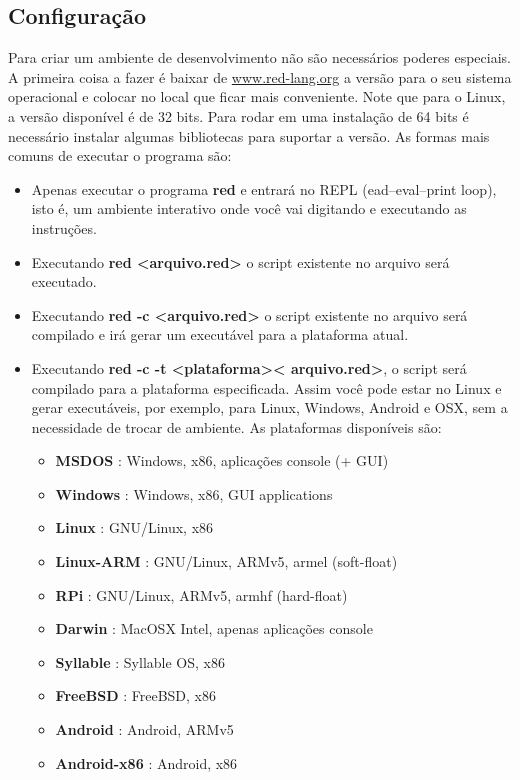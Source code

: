 \documentclass[12pt,a4paper]{article}
\begin{document}
\subsection{Configuração}

Para criar um ambiente de desenvolvimento não são necessários poderes especiais.
A primeira coisa a fazer é baixar de 
\href{http://www.red-lang.org/p/download.html}{www.red-lang.org} a versão para o
seu sistema operacional e colocar no local que ficar mais conveniente. Note que
para o Linux, a versão disponível é de 32 bits. Para rodar em uma instalação de
64 bits é necessário instalar algumas bibliotecas para suportar a versão. As
formas mais comuns de executar o programa são:

\begin{itemize}
\item Apenas executar o programa \textbf{red} e entrará no REPL (ead–eval–print loop),
  isto é, um ambiente interativo onde você vai digitando e executando as
  instruções.
\item Executando \textbf{red \textless arquivo.red\textgreater} o script
  existente no arquivo será executado.
\item Executando \textbf{red -c \textless arquivo.red\textgreater} o script
  existente no arquivo será compilado e irá gerar um executável para a
  plataforma atual.
\item Executando \textbf{red -c -t \textless plataforma\textgreater \textless
    arquivo.red\textgreater}, o script será compilado para a plataforma
  especificada. Assim você pode estar no Linux e gerar executáveis, por exemplo,
  para Linux, Windows, Android e OSX, sem a necessidade de trocar de ambiente.
  As plataformas disponíveis são:
  \begin{itemize}
  \item \textbf{MSDOS} : Windows, x86, aplicações console (+ GUI)
  \item \textbf{Windows} : Windows, x86, GUI applications
  \item \textbf{Linux} : GNU/Linux, x86
  \item \textbf{Linux-ARM} : GNU/Linux, ARMv5, armel (soft-float)
  \item \textbf{RPi} : GNU/Linux, ARMv5, armhf (hard-float)
  \item \textbf{Darwin} : MacOSX Intel, apenas aplicações console
  \item \textbf{Syllable} : Syllable OS, x86
  \item \textbf{FreeBSD} : FreeBSD, x86
  \item \textbf{Android} : Android, ARMv5
  \item \textbf{Android-x86} : Android, x86
  \end{itemize}

\end{itemize}
\end{document}
